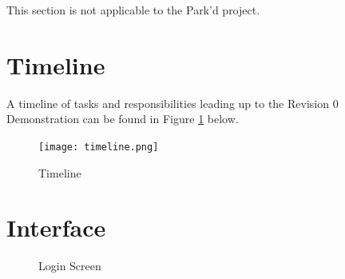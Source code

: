 \documentclass[12pt, titlepage]{article}
\begin{document}
This section is not applicable to the Park'd project.

\newpage
\section{Timeline}

A timeline of tasks and responsibilities leading up to the Revision 0
Demonstration can be found in Figure \ref{fig:timeline} below.

\begin{figure}[h]
    \begin{center}
        \texttt{[image: timeline.png]}
        \caption{Timeline}
        \label{fig:timeline}
    \end{center}
\end{figure}


\newpage{}

\appendix
\section{Interface}

\begin{figure}[hp!]
\begin{center}
    \caption{Login Screen}
    \label{fig:login}
\end{center}
\end{figure}
\end{document}
